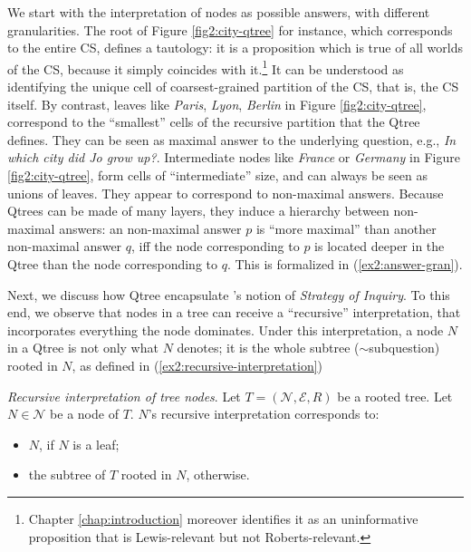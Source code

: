 We start with the interpretation of nodes as possible answers, with different granularities. The root of Figure \ref{fig2:city-qtree} for instance, which corresponds to the entire CS, defines a tautology: it is a proposition which is true of all worlds of the CS, because it simply coincides with it.\footnote{Chapter \ref{chap:introduction} moreover identifies it as an uninformative proposition that is Lewis-relevant but not Roberts-relevant.} It can be understood as identifying the unique cell of coarsest-grained partition of the CS, that is, the CS itself. By contrast, leaves like \textit{Paris}, \textit{Lyon}, \textit{Berlin} in Figure \ref{fig2:city-qtree}, correspond to the ``smallest'' cells of the recursive partition that the Qtree defines. They can be seen as maximal answer to the underlying question, e.g., \textit{In which city did Jo grow up?}. Intermediate nodes like \textit{France} or \textit{Germany} in Figure \ref{fig2:city-qtree}, form cells of ``intermediate'' size, and can always be seen as unions of leaves. They appear to correspond to non-maximal answers. Because Qtrees can be made of many layers, they induce a hierarchy between non-maximal answers: an non-maximal answer $p$ is ``more maximal'' than another non-maximal answer $q$, iff the node corresponding to $p$ is located deeper in the Qtree than the node corresponding to $q$. This is formalized in (\ref{ex2:answer-gran}).

\begin{exe}
	\label{ex2:answer-gran}
\end{exe}


Next, we discuss how Qtree encapsulate \citeauthor{Roberts1996}'s notion of \textit{Strategy of Inquiry}. To this end, we observe that nodes in a tree can receive a ``recursive'' interpretation, that incorporates everything the node dominates. Under this interpretation, a node $N$ in a Qtree is not only what $N$ denotes; it is the whole subtree ($\sim$subquestion) rooted in $N$, as defined in (\ref{ex2:recursive-interpretation})


\begin{exe}
	\ex\label{ex2:recursive-interpretation} {\textit{Recursive interpretation of tree nodes}. Let $T = (\mathcal{N}, \mathcal{E}, R)$ be a rooted tree. Let $N \in \mathcal{N}$ be a node of $T$. $N$'s recursive interpretation corresponds to:
		\begin{itemize}
			\item $N$, if $N$ is a leaf;
			\item the subtree of $T$ rooted in $N$, otherwise. 
	\end{itemize}}
\end{exe}

